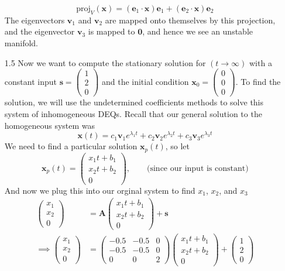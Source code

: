 \documentclass[12pt]{article}
\begin{document}
\begin{enumerate}
\[
    \text{proj}_{V}(\mathbf{x}) = \left(\mathbf{e}_{1} \cdot \mathbf{x}\right)\mathbf{e}_{1} + \left(\mathbf{e}_{2} \cdot \mathbf{x}\right)\mathbf{e}_{2}
\]
The eigenvectors $\mathbf{v}_{1}$ and $\mathbf{v}_{2}$ are mapped onto themselves by this projection, and the eigenvector $\mathbf{v}_{3}$ is mapped to $\mathbf{0}$, and hence we 
see an unstable manifold.
\item[1.5] Now we want to compute the stationary solution for $(t \rightarrow \infty)$ with a constant input $\mathbf{s}=\begin{pmatrix}1\\ 2\\ 0\end{pmatrix}$ and the initial condition $\mathbf{x}_{0}=\begin{pmatrix}0\\ 0\\ 0\end{pmatrix}$.
To find the solution, we will use the undetermined coefficients methods to solve this system of inhomogeneous DEQs. Recall that our general solution to the homogeneous system was
\[
    \mathbf{x}(t)=c_{1}\mathbf{v}_{1}e^{\lambda_{1}t} + c_{2}\mathbf{v}_{2}e^{\lambda_{2}t} + c_{3}\mathbf{v}_{3}e^{\lambda_{3}t}
\]
We need to find a particular solution $\mathbf{x}_{p}(t)$, so let
\[
\mathbf{x}_{p}(t)=\begin{pmatrix}x_{1}t + b_{1}\\ x_{2}t + b_{2}\\ 0\end{pmatrix}, \qquad \text{(since our input is constant)}
\]
And now we plug this into our orginal system to find $x_{1}$, $x_{2}$, and $x_{3}$
\begin{align*}
    \begin{pmatrix}x_{1}\\ x_{2}\\ 0\end{pmatrix} &= \mathbf{A}\begin{pmatrix}x_{1}t + b_{1}\\ x_{2}t + b_{2}\\ 0\end{pmatrix} + \mathbf{s}\\
    \implies \begin{pmatrix}x_{1}\\ x_{2}\\ 0\end{pmatrix} &= \begin{pmatrix}-0.5 & -0.5 & 0\\ -0.5 & -0.5 & 0\\0 & 0 & 2\end{pmatrix}\begin{pmatrix}x_{1}t + b_{1}\\ x_{2}t + b_{2}\\ 0\end{pmatrix} + \begin{pmatrix}1\\ 2\\ 0\end{pmatrix}\\

\end{align*}
\end{enumerate}
\end{document}
